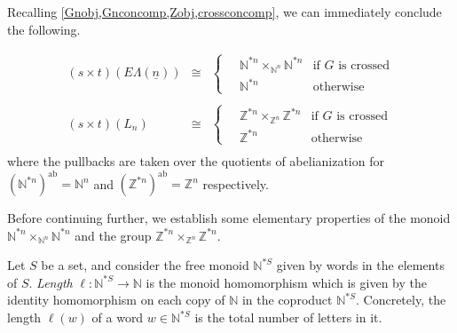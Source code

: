\documentclass{amsbook} %
\newcommand{\N}{\mathbb{N}}
\newcommand{\ELn}{E\Lambda(\underline{n})}
\numberwithin{section}{chapter}
\begin{document}
Recalling \cref{Gnobj,Gnconcomp,Zobj,crossconcomp}, we can immediately conclude the following.

\begin{cor} \label{stpullback}
\[\begin{array}{rll} 
		(s \times t)(\ELn) & \cong & \begin{cases}
								\quad \mathbb{N}^{\ast n} \times_{\mathbb{N}^n} \mathbb{N}^{\ast n} & \text{if $G$ is crossed}\\
								\quad \mathbb{N}^{\ast n} & \text{otherwise}
							\end{cases} \\
		& & \\
		(s \times t)(L_n) & \cong & \begin{cases}
								\quad \mathbb{Z}^{\ast n} \times_{\mathbb{Z}^n} \mathbb{Z}^{\ast n}  & \text{if $G$ is crossed}\\
								\quad \mathbb{Z}^{\ast n} & \text{otherwise}
							\end{cases} \\
		\end{array}
\]
where the pullbacks are taken over the quotients of abelianization for $(\mathbb{N}^{\ast n})^{\mathrm{ab}} = \mathbb{N}^n$ and $(\mathbb{Z}^{\ast n})^{\mathrm{ab}} = \mathbb{Z}^n$ respectively.
\end{cor}

Before continuing further, we establish some elementary properties of the monoid $\mathbb{N}^{\ast n} \times_{\mathbb{N}^n} \mathbb{N}^{\ast n}$ and the group $\mathbb{Z}^{\ast n} \times_{\mathbb{Z}^n} \mathbb{Z}^{\ast n}$.

\begin{Defi}\label{length}
Let $S$ be a set, and consider the free monoid $\N^{*S}$ given by words in the elements of $S$. \emph{Length} $\ell:\N^{*S} \to \N$ is the monoid homomorphism which is given by the identity homomorphism on each copy of $\N$ in the coproduct $\N^{*S}$. Concretely, the length $\ell(w)$ of a word $w \in \N^{*S}$ is the total number of letters in it.
\end{Defi}
\end{document}
